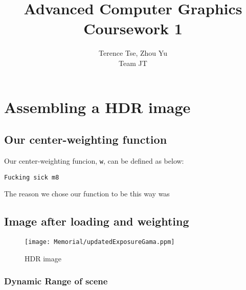 \documentclass{article}
\begin{document}
\title{Advanced Computer Graphics\\ Coursework 1}
\author{Terence Tse, Zhou Yu \\ Team JT}
\maketitle
\newpage

\section{Assembling a HDR image}

\subsection{Our center-weighting function}
Our center-weighting funcion, \texttt{w}, can be defined as below:
\begin{verbatim}
Fucking sick m8
\end{verbatim}
The reason we chose our function to be this way was

\subsection{Image after loading and weighting}
\begin{center}
	\begin{figure}[H]
		\begin{center}
			\texttt{[image: Memorial/updatedExposureGama.ppm]}
			\caption{HDR image}
		\end{center}
	\end{figure}
\end{center}

\subsubsection{ Dynamic Range of scene} 

\end{document}
